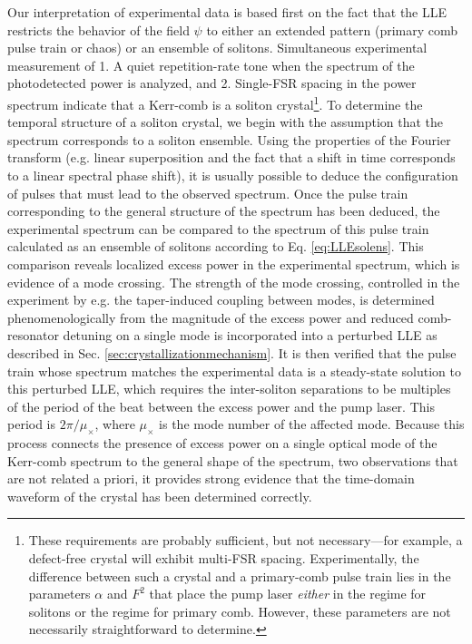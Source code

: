 Our interpretation of experimental data is based first on the fact that the LLE restricts the behavior of the field $\psi$ to either an extended pattern (primary comb pulse train or chaos) or an ensemble of solitons. Simultaneous experimental measurement of 1. A quiet repetition-rate tone when the spectrum of the photodetected power is analyzed, and 2. Single-FSR spacing in the power spectrum indicate that a Kerr-comb is a soliton crystal\footnote{These requirements are probably sufficient, but not necessary---for example, a defect-free crystal will exhibit multi-FSR spacing. Experimentally, the difference between such a crystal and a primary-comb pulse train lies in the parameters $\alpha$ and $F^2$ that place the pump laser \textit{either} in the regime for solitons or the regime for primary comb. However, these parameters are not necessarily straightforward to determine.}. To determine the temporal structure of a soliton crystal, we begin with the assumption that the spectrum corresponds to a soliton ensemble. Using the properties of the Fourier transform (e.g. linear superposition and the fact that a shift in time corresponds to a linear spectral phase shift), it is usually possible to deduce the configuration of pulses that must lead to the observed spectrum. Once the pulse train corresponding to the general structure of the spectrum has been deduced, the experimental spectrum can be compared to the spectrum of this pulse train calculated as an ensemble of solitons according to Eq. \ref{eq:LLEsolens}. This comparison reveals localized excess power in the experimental spectrum, which is evidence of a mode crossing. The strength of the mode crossing, controlled in the experiment by e.g. the taper-induced coupling between modes, is determined phenomenologically from the magnitude of the excess power and reduced comb-resonator detuning on a single mode is incorporated into a perturbed LLE as described in Sec. \ref{sec:crystallizationmechanism}. It is then verified that the pulse train whose spectrum matches the experimental data is a steady-state solution to this perturbed LLE, which requires the inter-soliton separations to be multiples of the period of the beat between the excess power and the pump laser. This period is $2\pi /\mu_\times$, where $\mu_\times$ is the mode number of the affected mode. Because this process connects the presence of excess power on a single optical mode of the Kerr-comb spectrum to the general shape of the spectrum, two observations that are not related a priori, it provides strong evidence that the time-domain waveform of the crystal has been determined correctly.

